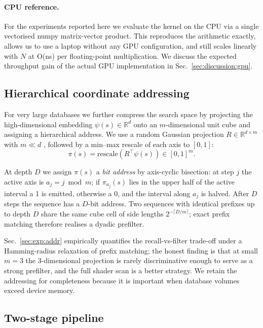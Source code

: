 \documentclass[twocolumn,11pt,a4paper]{article}
\theoremstyle{definition}
\theoremstyle{remark}
\newcommand{\R}{\mathbb{R}}
\begin{document}
\paragraph{CPU reference.} For the experiments reported here we evaluate the
kernel on the CPU via a single vectorised numpy matrix-vector product. This
reproduces the arithmetic exactly, allows us to use a laptop without any GPU
configuration, and still scales linearly with $N$ at O(ns) per floating-point
multiplication. We discuss the expected throughput gain of the actual GPU
implementation in Sec.~\ref{sec:discussion:gpu}.

\subsection{Hierarchical coordinate addressing}
\label{sec:method:addr}

For very large databases we further compress the search space by projecting
the high-dimensional embedding $\psi(s) \in \R^d$ onto an $m$-dimensional
unit cube and assigning a hierarchical address. We use a random Gaussian
projection $R \in \R^{d \times m}$ with $m \ll d$
\citep{johnson1984,indyk1998}, followed by a min--max rescale of each axis
to $[0, 1]$:
\begin{equation}
    \pi(s) = \mathrm{rescale}(R^\top \psi(s)) \in [0,1]^m.
\end{equation}

At depth $D$ we assign $\pi(s)$ a \emph{bit address} by axis-cyclic
bisection: at step $j$ the active axis is $a_j = j \bmod m$; if
$\pi_{a_j}(s)$ lies in the upper half of the active interval a 1 is emitted,
otherwise a 0, and the interval along $a_j$ is halved. After $D$ steps the
sequence has a $D$-bit address. Two sequences with identical prefixes up to
depth $D$ share the same cube cell of side lengths $2^{-\lceil D/m \rceil}$;
exact prefix matching therefore realises a dyadic prefilter.

Sec.~\ref{sec:exp:addr} empirically quantifies the recall-vs-filter
trade-off under a Hamming-radius relaxation of prefix matching; the honest
finding is that at small $m = 3$ the $3$-dimensional projection is rarely
discriminative enough to serve as a strong prefilter, and the full shader
scan is a better strategy. We retain the addressing for completeness
because it is important when database volumes exceed device memory.

\subsection{Two-stage pipeline}
\label{sec:method:pipeline}
\end{document}
